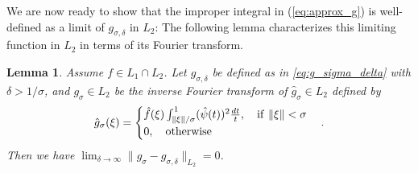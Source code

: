 \documentclass[11pt]{article}
\newtheorem{lemma}[theorem]{Lemma}
\theoremstyle{remark}
\theoremstyle{example}
\theoremstyle{remark}
\begin{document}
\begin{comment}
&=&  \lim_{\delta \to \infty}  \int_{ \| \xi \| < \sigma } |\hat{f}(\xi) |^2 \left|  \int_{ \min(1, \| \xi \| \delta) }^{1} (\hat{\psi} (t) )^2  \frac{dt}{t}  \right|^2 d\xi \nonumber \\
&=&  \int_{ \| \xi \| < \sigma } |\hat{f}(\xi) |^2  \lim_{\delta \to \infty}   \left|  \int_{ \min(1, \| \xi \| \delta) }^{1} (\hat{\psi} (t) )^2  \frac{dt}{t}  \right|^2 d\xi \label{eq:dominated_490} \\
&=&  \int_{ \| \xi \| < \sigma } |\hat{f}(\xi) |^2     \left|  \int_{1}^{1} (\hat{\psi} (t) )^2  \frac{dt}{t}  \right|^2 d\xi=0, \nonumber
\end{eqnarray}
where (\ref{eq:dominated_490}) follows from the dominated convergence theorem.
\end{proof}
\end{comment}

We are now ready to show that the improper integral in (\ref{eq:approx_g}) is well-defined as a limit of $g_{\sigma,\delta}$ in $L_2$: The following lemma characterizes this limiting function in $L_2$ in terms of its Fourier transform.

\begin{lemma} \label{lemma:g_sigma_fourier_416}
Assume $f \in L_1 \cap L_2$.
Let $g_{\sigma,\delta}$ be defined as in \eqref{eq:g_sigma_delta} with $\delta > 1/\sigma$, and  $g_{\sigma} \in L_2$ be the inverse Fourier transform of $\hat{g}_\sigma \in L_2$ defined by
\[
\hat{g}_{\sigma}(\xi) =
\begin{cases}
\hat{f}(\xi)  \int_{\| \xi \| / \sigma}^1 (\hat{\psi} (t) )^2  \frac{dt}{t}, \quad {\rm if}\ \| \xi \| < \sigma\\
0, \quad {\rm otherwise}
\end{cases}.
\]
Then we have $\lim_{ \delta \to \infty } \| g_\sigma - g_{\sigma,\delta} \|_{L_2} = 0$.
\end{lemma}
\end{document}
